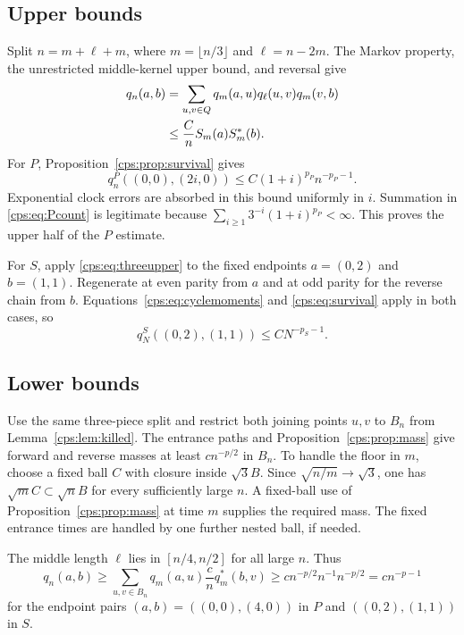 \documentclass[11pt,letterpaper]{article}
\numberwithin{equation}{section}
\theoremstyle{remark}\newtheorem{remark}[theorem]{Remark}
\begin{document}
\subsection{Upper bounds}
Split $n=m+\ell+m$, where $m=\lfloor n/3\rfloor$ and $\ell=n-2m$. The Markov property, the unrestricted middle-kernel upper bound, and reversal give
\begin{align}\label{cps:eq:threeupper}
 q_n(a,b)
 &=\sum_{u,v\in Q}q_m(a,u)q_\ell(u,v)q_m(v,b)\notag\\
 &\le\frac Cn S_m(a)S_m^*(b).
\end{align}
For $P$, Proposition~\ref{cps:prop:survival} gives
\begin{equation}\label{cps:eq:Pupper}
 q_n^P((0,0),(2i,0))\le C(1+i)^{p_P}n^{-p_P-1}.
\end{equation}
Exponential clock errors are absorbed in this bound uniformly in $i$. Summation in \eqref{cps:eq:Pcount} is legitimate because $\sum_{i\ge1}3^{-i}(1+i)^{p_P}<\infty$. This proves the upper half of the $P$ estimate.

For $S$, apply \eqref{cps:eq:threeupper} to the fixed endpoints $a=(0,2)$ and $b=(1,1)$. Regenerate at even parity from $a$ and at odd parity for the reverse chain from $b$. Equations~\eqref{cps:eq:cyclemoments} and \eqref{cps:eq:survival} apply in both cases, so
\begin{equation}\label{cps:eq:Supper}
 q_N^S((0,2),(1,1))\le CN^{-p_S-1}.
\end{equation}

\subsection{Lower bounds}
Use the same three-piece split and restrict both joining points $u,v$ to $B_n$ from Lemma~\ref{cps:lem:killed}. The entrance paths and Proposition~\ref{cps:prop:mass} give forward and reverse masses at least $cn^{-p/2}$ in $B_n$. To handle the floor in $m$, choose a fixed ball $C$ with closure inside $\sqrt3B$. Since $\sqrt{n/m}\to\sqrt3$, one has $\sqrt mC\subset\sqrt nB$ for every sufficiently large $n$. A fixed-ball use of Proposition~\ref{cps:prop:mass} at time $m$ supplies the required mass. The fixed entrance times are handled by one further nested ball, if needed.

The middle length $\ell$ lies in $[n/4,n/2]$ for all large $n$. Thus
\begin{equation}\label{cps:eq:threelower}
 q_n(a,b)\ge
 \sum_{u,v\in B_n}q_m(a,u)\frac cn q_m^*(b,v)
 \ge c n^{-p/2}n^{-1}n^{-p/2}=cn^{-p-1}
\end{equation}
for the endpoint pairs $(a,b)=((0,0),(4,0))$ in $P$ and $((0,2),(1,1))$ in $S$.
\end{document}
